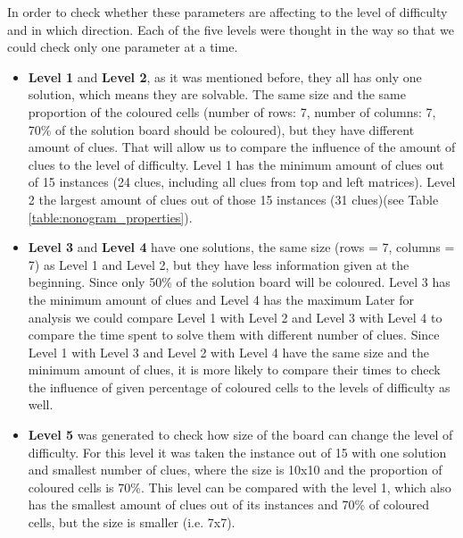 In order to check whether these parameters are affecting to the level of difficulty and in which direction. Each of the five levels were thought in the way so that we could check only one parameter at a time. 
\begin{itemize}
    \item \textbf{Level 1} and \textbf{Level 2}, as it was mentioned before, they all has only one solution, which means they are solvable. The same size and the same proportion of the coloured cells (number of rows: 7, number of columns:  7, 70\% of the solution board should be coloured), but they have different amount of clues. That will allow us to compare the influence of the amount of clues to the level of difficulty. Level 1 has the minimum amount of clues out of 15 instances (24 clues, including all clues from top and left matrices). Level 2 the largest amount of clues out of those 15 instances (31 clues)(see Table \ref{table:nonogram_properties}).
    \item \textbf{Level 3} and \textbf{Level 4}  have one solutions, the same size (rows = 7, columns = 7) as Level 1 and Level 2, but they have less information given at the beginning. Since only 50\% of the solution board will be coloured. Level 3 has the minimum amount of clues and Level 4 has the maximum
    Later for analysis we could compare Level 1 with Level 2 and Level 3 with Level 4 to compare the time spent to solve them with different number of clues. 
    Since Level 1 with Level 3 and Level 2 with Level 4 have the same size and the minimum amount of clues, it is more likely to compare their times to check the influence of given percentage of coloured cells to the levels of difficulty as well. 
    \item \textbf{Level 5} was generated to check how size of the board can change the level of difficulty. For this level it was taken the instance out of 15 with one solution and smallest number of clues, where the size is 10x10 and the proportion of coloured cells is 70\%. This level can be compared with the level 1, which also has the smallest amount of clues out of its instances and 70\% of coloured cells, but the size is smaller (i.e. 7x7). 
\end{itemize}

